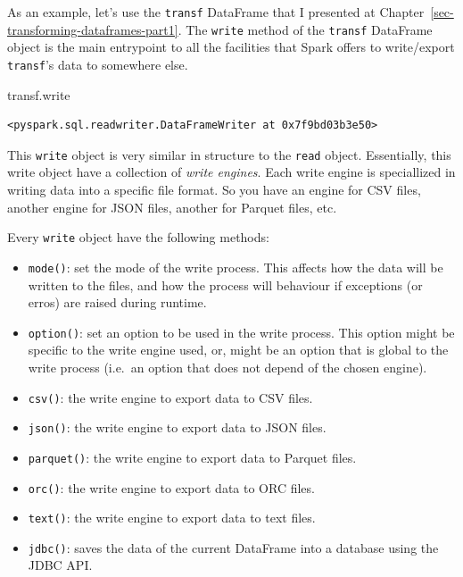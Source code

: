 \documentclass[
  11pt,
  letterpaper,
  DIV=11,
  numbers=noendperiod]{scrreprt}
\newenvironment{Shaded}{\begin{snugshade}}{\end{snugshade}}
\newcommand{\NormalTok}[1]{\textcolor[rgb]{0.00,0.23,0.31}{#1}}
\providecommand{\tightlist}{%
  \setlength{\itemsep}{0pt}\setlength{\parskip}{0pt}}\usepackage{longtable,booktabs,array}
\begin{document}
As an example, let's use the \texttt{transf} DataFrame that I presented
at Chapter~\ref{sec-transforming-dataframes-part1}. The \texttt{write}
method of the \texttt{transf} DataFrame object is the main entrypoint to
all the facilities that Spark offers to write/export \texttt{transf}'s
data to somewhere else.

\begin{Shaded}
\begin{Highlighting}[]
\NormalTok{transf.write}
\end{Highlighting}
\end{Shaded}

\begin{verbatim}
<pyspark.sql.readwriter.DataFrameWriter at 0x7f9bd03b3e50>
\end{verbatim}

This \texttt{write} object is very similar in structure to the
\texttt{read} object. Essentially, this write object have a collection
of \emph{write engines}. Each write engine is speciallized in writing
data into a specific file format. So you have an engine for CSV files,
another engine for JSON files, another for Parquet files, etc.

Every \texttt{write} object have the following methods:

\begin{itemize}
\tightlist
\item
  \texttt{mode()}: set the mode of the write process. This affects how
  the data will be written to the files, and how the process will
  behaviour if exceptions (or erros) are raised during runtime.
\item
  \texttt{option()}: set an option to be used in the write process. This
  option might be specific to the write engine used, or, might be an
  option that is global to the write process (i.e.~an option that does
  not depend of the chosen engine).
\item
  \texttt{csv()}: the write engine to export data to CSV files.
\item
  \texttt{json()}: the write engine to export data to JSON files.
\item
  \texttt{parquet()}: the write engine to export data to Parquet files.
\item
  \texttt{orc()}: the write engine to export data to ORC files.
\item
  \texttt{text()}: the write engine to export data to text files.
\item
  \texttt{jdbc()}: saves the data of the current DataFrame into a
  database using the JDBC API.
\end{itemize}
\end{document}
